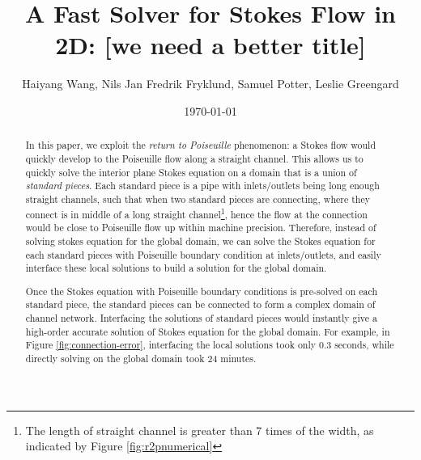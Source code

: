 \documentclass[10pt,twocolumn]{article}
\author{Haiyang Wang, Nils Jan Fredrik Fryklund, Samuel Potter, Leslie Greengard}
\date{\today}
\title{A Fast Solver for Stokes Flow in 2D: [we need a better title]}
\begin{document}
\maketitle

\begin{abstract}
  In this paper, we exploit the \textit{return to Poiseuille} phenomenon: 
  a Stokes flow would quickly develop to the Poiseuille flow along a straight channel. 
  This allows us to quickly solve the interior plane Stokes equation 
  on a domain that is a union of \textit{standard pieces}. 
  Each standard piece is a pipe with inlets/outlets 
  being long enough straight channels, such that when two standard pieces are connecting,
  where they connect is in middle of a long
  straight channel\footnote{
  The length of straight channel is greater than 7 times of the width, 
  as indicated by Figure \ref{fig:r2pnumerical}}, hence the flow 
  at the connection would be close to Poiseuille flow up within machine precision. 
  Therefore, instead of solving stokes equation for the global domain, 
  we can solve the Stokes equation 
  for each standard pieces with Poiseuille 
  boundary condition at inlets/outlets, 
  and easily interface these local solutions 
  to build a solution for the global domain. 
  
  Once the Stokes equation with Poiseuille boundary conditions is pre-solved on each standard piece, 
  the standard pieces can be connected to form a complex domain of channel network. 
  Interfacing the solutions of standard pieces
  would instantly give a high-order accurate solution of Stokes equation 
  for the global domain. 
  For example, in Figure \ref{fig:connection-error}, interfacing the local solutions took only 0.3 seconds, while directly
  solving on the global domain took 24 minutes. 
\end{abstract}
\end{document}
